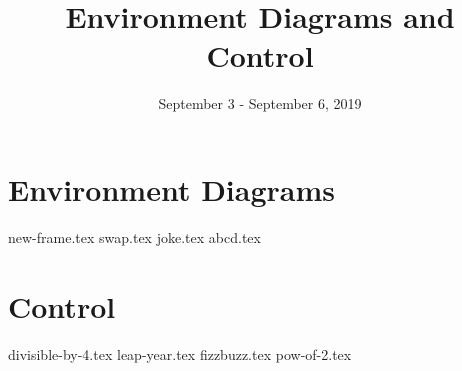 \documentclass{exam}
\title{Environment Diagrams and Control}
\date{September 3 - September 6, 2019}
\begin{document}
\maketitle

\section{Environment Diagrams}
\begin{questions}
{new-frame.tex}
{swap.tex}
\newpage
{joke.tex}
{abcd.tex}
\end{questions}

\section{Control}
\begin{questions}
{divisible-by-4.tex}
{leap-year.tex}
{fizzbuzz.tex}
{pow-of-2.tex}
\end{questions}
\end{document}
